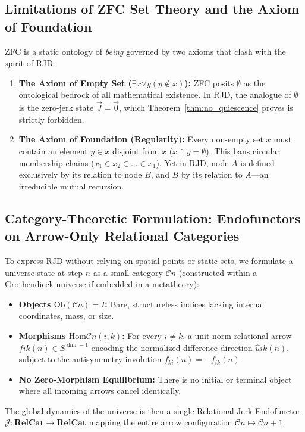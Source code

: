 \documentclass[11pt,a4paper]{article}
\theoremstyle{plain}
\theoremstyle{definition}
\theoremstyle{remark}
\begin{document}
\subsection{Limitations of ZFC Set Theory and the Axiom of Foundation}
ZFC is a static ontology of \textit{being} governed by two axioms that clash with the spirit of RJD:
\begin{enumerate}
\item \textbf{The Axiom of Empty Set ($\exists x \forall y (y \notin x)$):} ZFC posits $\emptyset$ as the ontological bedrock of all mathematical existence. In RJD, the analogue of $\emptyset$ is the zero-jerk state $\vec{J} = \vec{0}$, which Theorem~\ref{thm:no_quiescence} proves is strictly forbidden.
\item \textbf{The Axiom of Foundation (Regularity):} Every non-empty set $x$ must contain an element $y \in x$ disjoint from $x$ ($x \cap y = \emptyset$). This bans circular membership chains ($x_1 \in x_2 \in \dots \in x_1$). Yet in RJD, node $A$ is defined exclusively by its relation to node $B$, and $B$ by its relation to $A$---an irreducible mutual recursion.
\end{enumerate}
\subsection{Category-Theoretic Formulation: Endofunctors on Arrow-Only Relational Categories}
To express RJD without relying on spatial points or static sets, we formulate a universe state at step $n$ as a small category $\mathcal{C}n$ (constructed within a Grothendieck universe if embedded in a metatheory):
\begin{itemize}
\item \textbf{Objects $\mathrm{Ob}(\mathcal{C}n) = I$:} Bare, structureless indices lacking internal coordinates, mass, or size.
\item \textbf{Morphisms $\mathrm{Hom}{\mathcal{C}n}(i, k)$:} For every $i \neq k$, a unit-norm relational arrow $f{ik}(n) \in S^{\dim-1}$ encoding the normalized difference direction $\hat{u}{ik}(n)$, subject to the antisymmetry involution $f_{ki}(n) = -f_{ik}(n)$.
\item \textbf{No Zero-Morphism Equilibrium:} There is no initial or terminal object where all incoming arrows cancel identically.
\end{itemize}
The global dynamics of the universe is then a single Relational Jerk Endofunctor $\mathcal{J}: \mathbf{RelCat} \to \mathbf{RelCat}$ mapping the entire arrow configuration $\mathcal{C}n \mapsto \mathcal{C}{n+1}$.
\end{document}
